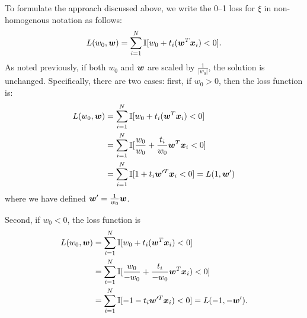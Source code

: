 To formulate the approach discussed above, we write 
the 0--1 loss for $\xi$ in non-homogenous notation as follows:
\begin{equation}\label{eq:loss}
L(w_0,\boldsymbol{w}) = \sum_{i=1}^N \mathbb{I} [w_0 + t_i (\boldsymbol{w}^T \boldsymbol{x}_i) < 0].
\end{equation}
%
As noted previously, if both $w_0$ and $\boldsymbol{w}$ are scaled by $\frac{1}{|w_0|}$, the
solution is unchanged.  Specifically, there are two
cases: first, if $w_0>0$, then the loss function is:
\begin{align*}
L(w_0,\boldsymbol{w}) &= \sum_{i=1}^N \mathbb{I} [w_0 + t_i (\boldsymbol{w}^T \boldsymbol{x}_i) < 0] \\
&=\sum_{i=1}^N \mathbb{I} [\frac{w_0}{w_0} + \frac{t_i}{w_0}\boldsymbol{w}^T \boldsymbol{x}_i < 0]  \\
&= \sum_{i=1}^N \mathbb{I} [1 + t_i\boldsymbol{w}'^T \boldsymbol{x}_i < 0] = L(1, \boldsymbol{w}')
\end{align*}
where we have defined $\boldsymbol{w}' = \frac{1}{w_0}\boldsymbol{w}$. 

Second, if $w_0 < 0$, the loss function is 
\begin{align*}
L(w_0,\boldsymbol{w}) &= \sum_{i=1}^N \mathbb{I} [w_0 + t_i (\boldsymbol{w}^T \boldsymbol{x}_i) < 0] \\
&=\sum_{i=1}^N \mathbb{I} [\frac{w_0}{-w_0} + \frac{t_i}{-w_0}\boldsymbol{w}^T \boldsymbol{x}_i) < 0]  \\
&= \sum_{i=1}^N \mathbb{I} [-1 - t_i \boldsymbol{w}'^T \boldsymbol{x}_i) < 0] 
= L(-1, -\boldsymbol{w}').
\end{align*} 

